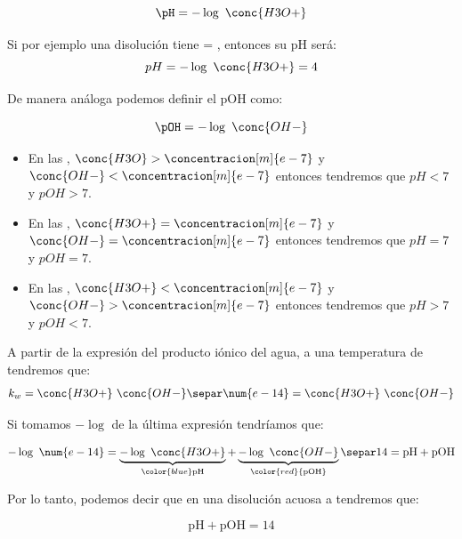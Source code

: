     \begin{equation}
        \pH = -\log\ \conc{H3O+}\label{eq:pH}
    \end{equation}

    Si por ejemplo una disolución tiene  = , entonces su pH será:
    \begin{equation*}
        pH = -\log\ \conc{H3O+} = 4
    \end{equation*}

    De manera análoga podemos definir el pOH como:

    \begin{equation}
        \pOH = -\log\ \conc{OH-}\label{eq:pOH}
    \end{equation}

    \begin{itemize}
        \item En las , \(\conc{H3O} > \concentracion[m]{e-7}\) y \(\conc{OH-} < \concentracion[m]{e-7}\) entonces tendremos que \(pH < 7\) y \(pOH > 7\).
        \item En las , \(\conc{H3O+} = \concentracion[m]{e-7}\) y \(\conc{OH-} = \concentracion[m]{e-7}\) entonces tendremos que \(pH = 7\) y \(pOH = 7\).
        \item En las , \(\conc{H3O+} < \concentracion[m]{e-7}\) y \(\conc{OH-} > \concentracion[m]{e-7}\) entonces tendremos que \(pH > 7\) y \(pOH < 7\).
    \end{itemize}

    A partir de la expresión del producto iónico del agua, a una temperatura de  tendremos que:
    \begin{gather*}
        k_w = \conc{H3O+}\ \conc{OH-}\separ
        \num{e-14} = \conc{H3O+}\ \conc{OH-}
    \end{gather*}

    Si tomamos \(-\log\) de la última expresión tendríamos que:

    \begin{gather*}
        -\log\ \num{e-14} =\underbrace{-\log\ \conc{H3O+}}_{\color{blue}\text{pH}} + \underbrace{-\log\ \conc{OH-}}_{\color{red}{\text{pOH}}} \separ
        14 = \text{pH} + \text{pOH}
    \end{gather*}

    Por lo tanto, podemos decir que en una disolución acuosa a  tendremos que:

    \begin{equation}
        \text{pH} + \text{pOH} = 14\label{eq:sumapHypOH}
    \end{equation}

